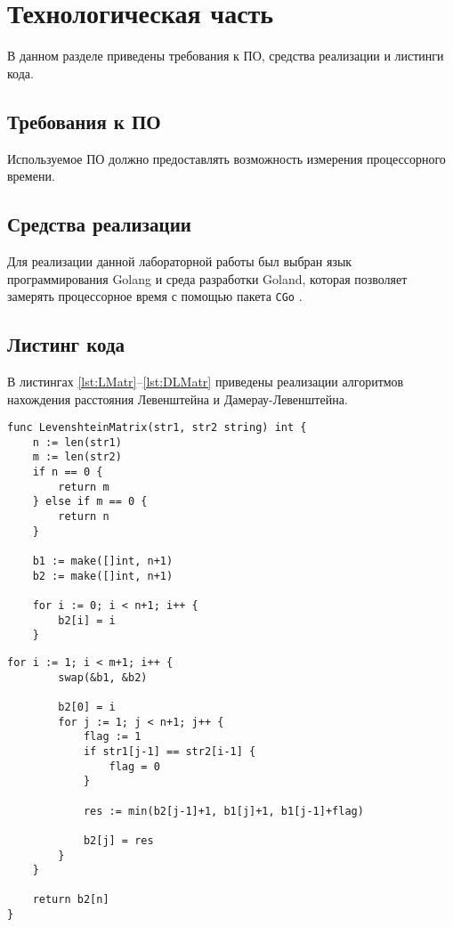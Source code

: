 \chapter{Технологическая часть}

В данном разделе приведены требования к ПО, средства реализации и листинги кода.

\section{Требования к ПО}

Используемое ПО должно предоставлять возможность измерения процессорного времени.

\section{Средства реализации}

Для реализации данной лабораторной работы был выбран язык программирования Golang \cite{golang} и среда разработки Goland, которая позволяет замерять процессорное время с помощью пакета \texttt{СGo} \cite{cgo}.

\clearpage
\section{Листинг кода}

В листингах \ref{lst:LMatr}--\ref{lst:DLMatr} приведены реализации алгоритмов нахождения расстояния Левенштейна и Дамерау-Левенштейна.

\begin{lstlisting}[label=lst:LMatr,caption=Функция нахождения расстояния Левенштейна с заполнением матрицы (начало)]
func LevenshteinMatrix(str1, str2 string) int {
	n := len(str1)
	m := len(str2)
	if n == 0 {
		return m
	} else if m == 0 {
		return n
	}
	
	b1 := make([]int, n+1)
	b2 := make([]int, n+1)
	
	for i := 0; i < n+1; i++ {
		b2[i] = i
	}
\end{lstlisting}

\clearpage
\begin{lstlisting}[caption=Функция нахождения расстояния Левенштейна с заполнением матрицы (окончание)]
	for i := 1; i < m+1; i++ {
		swap(&b1, &b2)
		
		b2[0] = i
		for j := 1; j < n+1; j++ {
			flag := 1
			if str1[j-1] == str2[i-1] {
				flag = 0
			}
			
			res := min(b2[j-1]+1, b1[j]+1, b1[j-1]+flag)
			
			b2[j] = res
		}		
	}
	
	return b2[n]
}
	
\end{lstlisting}

